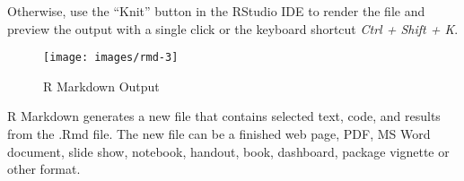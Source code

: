 \documentclass[]{book}
\begin{document}
Otherwise, use the ``Knit'' button in the RStudio IDE to render the file
and preview the output with a single click or the keyboard shortcut
\emph{Ctrl + Shift + K}.

\begin{figure}[h]
\texttt{[image: images/rmd-3]} \caption{R Markdown Output}\label{fig:g3}
\end{figure}

R Markdown generates a new file that contains selected text, code, and
results from the .Rmd file. The new file can be a finished web page,
PDF, MS Word document, slide show, notebook, handout, book, dashboard,
package vignette or other format.
\end{document}
